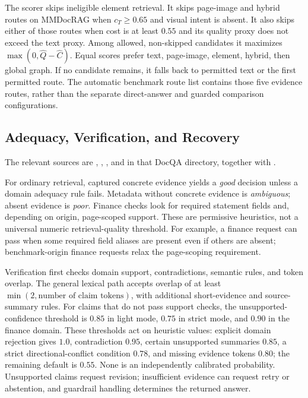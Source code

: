 The scorer skips ineligible element retrieval. It skips page-image and hybrid routes on MMDocRAG when $c_T\geq0.65$ and visual intent is absent. It also skips either of those routes when cost is at least $0.55$ and its quality proxy does not exceed the text proxy. Among allowed, non-skipped candidates it maximizes $\max(0,\widehat Q-\widehat C)$. Equal scores prefer text, page-image, element, hybrid, then global graph. If no candidate remains, it falls back to permitted text or the first permitted route. The automatic benchmark route list contains those five evidence routes, rather than the separate direct-answer and guarded comparison configurations.

\subsection{Adequacy, Verification, and Recovery}
The relevant sources are , , , and  in that DocQA directory, together with .

For ordinary retrieval, captured concrete evidence yields a \emph{good} decision unless a domain adequacy rule fails. Metadata without concrete evidence is \emph{ambiguous}; absent evidence is \emph{poor}. Finance checks look for required statement fields and, depending on origin, page-scoped support. These are permissive heuristics, not a universal numeric retrieval-quality threshold. For example, a finance request can pass when some required field aliases are present even if others are absent; benchmark-origin finance requests relax the page-scoping requirement.

Verification first checks domain support, contradictions, semantic rules, and token overlap. The general lexical path accepts overlap of at least $\min(2,\text{number of claim tokens})$, with additional short-evidence and source-summary rules. For claims that do not pass support checks, the unsupported-confidence threshold is $0.85$ in light mode, $0.75$ in strict mode, and $0.90$ in the finance domain. These thresholds act on heuristic values: explicit domain rejection gives $1.0$, contradiction $0.95$, certain unsupported summaries $0.85$, a strict directional-conflict condition $0.78$, and missing evidence tokens $0.80$; the remaining default is $0.55$. None is an independently calibrated probability. Unsupported claims request revision; insufficient evidence can request retry or abstention, and guardrail handling determines the returned answer.

